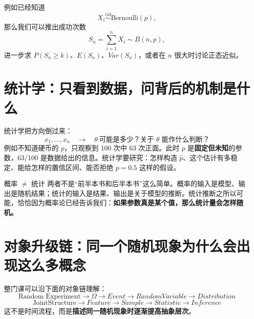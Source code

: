 \documentclass[11pt,a4paper,openany]{ctexbook}
\newcommand{\key}[1]{\textbf{\color{deep}#1}}
\begin{document}
例如已经知道
\[
X_i\overset{iid}{\sim}\mathrm{Bernoulli}(p),
\]
那么我们可以推出成功次数
\[
S_n=\sum_{i=1}^nX_i\sim B(n,p),
\]
进一步求 $P(S_n\ge k)$、$E(S_n)$、$Var(S_n)$，或者在 $n$ 很大时讨论正态近似。

\section{统计学：只看到数据，问背后的机制是什么}
统计学把方向倒过来：
\[
\boxed{x_1,\dots,x_n\quad\longrightarrow\quad \theta\ \text{可能是多少？关于 }\theta\text{ 能作什么判断？}}
\]
例如不知道硬币的 $p$，只观察到 100 次中 63 次正面。此时 $p$ 是\key{固定但未知}的参数，63/100 是数据给出的信息。统计学要研究：怎样构造 $\hat p$、这个估计有多稳定、能给怎样的置信区间、能否拒绝 $p=0.5$ 这样的假设。

\begin{boundarybox}{概率 $\neq$ 统计}
两者不是“前半本书和后半本书”这么简单。概率的输入是模型、输出是随机结果；统计的输入是结果、输出是关于模型的推断。统计推断之所以可能，恰恰因为概率论已经告诉我们：\key{如果参数真是某个值，那么统计量会怎样随机。}
\end{boundarybox}

\section{对象升级链：同一个随机现象为什么会出现这么多概念}
整门课可以沿下面的对象链理解：
\[
\boxed{\text{Random Experiment}\to\Omega\to Event\to RandomVariable\to Distribution}
\]
\[
\boxed{\text{JointStructure}\to Feature\to Sample\to Statistic\to Inference}
\]
这不是时间流程，而是\key{描述同一随机现象时逐渐提高抽象层次}。
\end{document}
